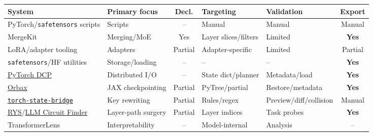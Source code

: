 
\begin{table}[t]
\centering
\small
\setlength{\tabcolsep}{4pt}
\renewcommand{\arraystretch}{1.08}

\begin{tabularx}{\textwidth}{
    @{}
    >{\raggedright\arraybackslash}X
    >{\raggedright\arraybackslash}p{}
    c
    >{\raggedright\arraybackslash}p{}
    >{\raggedright\arraybackslash}p{}
    c
    @{}
}
\toprule
\textbf{System}
& \textbf{Primary focus}
& \textbf{Decl.}
& \textbf{Targeting}
& \textbf{Validation}
& \textbf{Export} \\
\midrule
PyTorch/\texttt{safetensors} scripts
& Scripts
& --
& Manual
& Manual
& Manual \\

MergeKit~\citep{goddard2024mergekit}
& Merging/MoE
& Yes
& Layer slices/filters
& Limited
& \textbf{Yes} \\

LoRA/adapter tooling~\citep{hu2021lora}
& Adapters
& Partial
& Adapter-specific
& Limited
& Partial \\

\texttt{safetensors}/HF utilities
& Storage/loading
& --
& --
& --
& \textbf{Yes} \\

\href{https://docs.pytorch.org/docs/stable/distributed.checkpoint.html}{PyTorch DCP}
& Distributed I/O
& --
& State dict/planner
& Metadata/load
& \textbf{Yes} \\

\href{https://github.com/google/orbax}{Orbax}
& JAX checkpointing
& Partial
& PyTree/partial
& Restore/metadata
& \textbf{Yes} \\

\href{https://pypi.org/project/torch-state-bridge/}{\texttt{torch-state-bridge}}
& Key rewriting
& Partial
& Rules/regex
& Preview/diff/collision
& Manual \\

\href{https://dnhkng.github.io/posts/rys/}{RYS}/\href{https://github.com/alainnothere/llm-circuit-finder}{LLM Circuit Finder}
& Layer-path surgery
& Partial
& Layer indices
& Task probes
& \textbf{Yes} \\

TransformerLens~\citep{nanda2022transformerlens}
& Interpretability
& --
& Model-internal
& Analysis
& -- \\


\end{tabularx}
\end{table}
